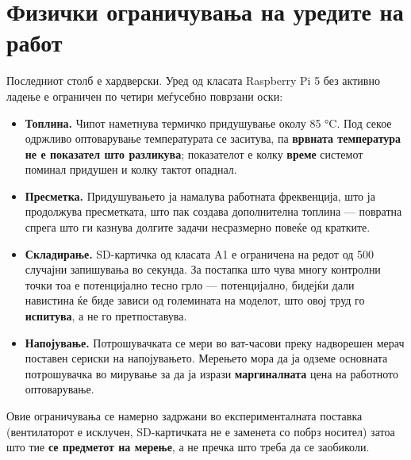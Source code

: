 \section{Физички ограничувања на уредите на работ}

Последниот столб е хардверски. Уред од класата Raspberry Pi 5 без активно ладење е
ограничен по четири меѓусебно поврзани оски:

\begin{itemize}
  \item \textbf{Топлина.} Чипот наметнува термичко придушување околу 85 °C. Под секое одржливо оптоварување температурата се заситува, па \textbf{врвната температура не е показател што разликува}; показателот е колку \textbf{време} системот поминал придушен и колку тактот опаднал.
  \item \textbf{Пресметка.} Придушувањето ја намалува работната фреквенција, што ја продолжува пресметката, што пак создава дополнителна топлина --- повратна спрега што ги казнува долгите задачи несразмерно повеќе од кратките.
  \item \textbf{Складирање.} SD-картичка од класата A1 е ограничена на редот од 500 случајни запишувања во секунда. За постапка што чува многу контролни точки тоа е потенцијално тесно грло --- потенцијално, бидејќи дали навистина ќе биде зависи од големината на моделот, што овој труд го \textbf{испитува}, а не го претпоставува.
  \item \textbf{Напојување.} Потрошувачката се мери во ват-часови преку надворешен мерач поставен сериски на напојувањето. Мерењето мора да ја одземе основната потрошувачка во мирување за да ја изрази \textbf{маргиналната} цена на работното оптоварување.
\end{itemize}

Овие ограничувања се намерно задржани во експерименталната поставка (вентилаторот е
исклучен, SD-картичката не е заменета со побрз носител) затоа што тие \textbf{се предметот на
мерење}, а не пречка што треба да се заобиколи.

